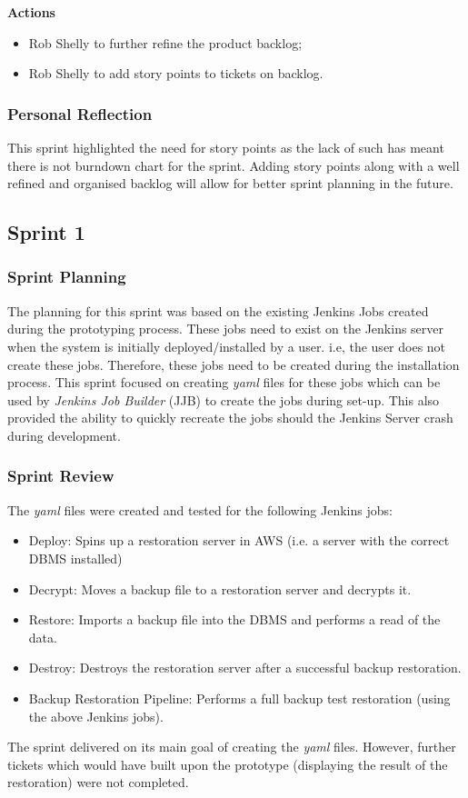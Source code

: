 		\noindent\textbf{Actions}
		\begin{itemize}
			\item Rob Shelly to further refine the product backlog;
			\item Rob Shelly to add story points to tickets on backlog.
		\end{itemize}
		
		\subsubsection{Personal Reflection}
		This sprint highlighted the need for story points as the lack of such has meant there is not burndown chart for the sprint. Adding story points along with a well refined and organised backlog will allow for better sprint planning in the future.

	\subsection{Sprint 1}
		\subsubsection{Sprint Planning}
		The planning for this sprint was based on the existing Jenkins Jobs created during the prototyping process. These jobs need to exist on the Jenkins server when the system is initially deployed/installed by a user. i.e, the user does not create these jobs.
		Therefore, these jobs need to be created during the installation process. This sprint focused on creating \textit{yaml} files for these jobs which can be used by \textit{Jenkins Job Builder} (JJB) to create the jobs during set-up. This also provided the ability to quickly recreate the jobs should the Jenkins Server crash during development.

		\subsubsection{Sprint Review}
		The \textit{yaml} files were created and tested for the following Jenkins jobs:
		\begin{itemize}
			\item Deploy: Spins up a restoration server in AWS (i.e. a server with the correct DBMS installed)
			\item Decrypt:  Moves a backup file to a restoration server and decrypts it.
			\item Restore: Imports a backup file into the DBMS and performs a read of the data.
			\item Destroy: Destroys the restoration server after a successful backup restoration.
			\item Backup Restoration Pipeline:	Performs a full backup test restoration (using the above Jenkins jobs).
		\end{itemize}
		The sprint delivered on its main goal of creating the \textit{yaml} files. However, further tickets which would have built upon the prototype (displaying the result of the restoration) were not completed.

